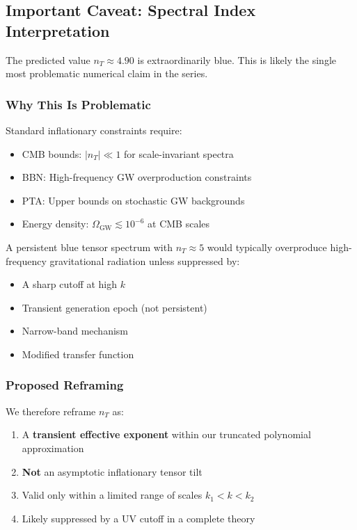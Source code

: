 \subsection*{Important Caveat: Spectral Index Interpretation}

The predicted value $n_T \approx 4.90$ is extraordinarily blue. This is likely the single most problematic numerical claim in the series.

\subsubsection*{Why This Is Problematic}
Standard inflationary constraints require:
\begin{itemize}
    \item CMB bounds: $|n_T| \ll 1$ for scale-invariant spectra
    \item BBN: High-frequency GW overproduction constraints
    \item PTA: Upper bounds on stochastic GW backgrounds
    \item Energy density: $\Omega_{\text{GW}} \lesssim 10^{-6}$ at CMB scales
\end{itemize}

A persistent blue tensor spectrum with $n_T \approx 5$ would typically overproduce high-frequency gravitational radiation unless suppressed by:
\begin{itemize}
    \item A sharp cutoff at high $k$
    \item Transient generation epoch (not persistent)
    \item Narrow-band mechanism
    \item Modified transfer function
\end{itemize}

\subsubsection*{Proposed Reframing}
We therefore reframe $n_T$ as:
\begin{enumerate}
    \item A \textbf{transient effective exponent} within our truncated polynomial approximation
    \item \textbf{Not} an asymptotic inflationary tensor tilt
    \item Valid only within a limited range of scales $k_1 < k < k_2$
    \item Likely suppressed by a UV cutoff in a complete theory
\end{enumerate}

